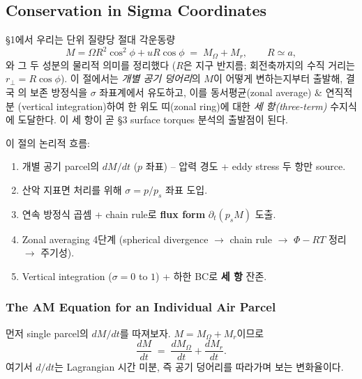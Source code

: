 \subsection{Conservation in Sigma Coordinates}

\S1에서 우리는 단위 질량당 절대 각운동량
\[
  M = \Omega R^2\cos^2\phi + u R\cos\phi
  \;=\; M_\Omega + M_r,
  \qquad R \simeq a,
\]
와 그 두 성분의 물리적 의미를 정리했다 ($R$은 지구 반지름;
회전축까지의 수직 거리는 $r_\perp = R\cos\phi$).  이 절에서는 \emph{개별 공기 덩어리}의
$M$이 어떻게 변하는지부터 출발해, 결국 의 보존 방정식을
$\sigma$ 좌표계에서 유도하고, 이를 동서평균(zonal average) $\&$ 연직적분
(vertical integration)하여 한 위도 띠(zonal ring)에 대한
\emph{세 항(three-term)} 수지식에 도달한다.  이 세 항이 곧
\S3 surface torques 분석의 출발점이 된다.


\begin{remarkbox}
이 절의 논리적 흐름:
\begin{enumerate}
  \item 개별 공기 parcel의 $dM/dt$ ($p$ 좌표) -- 압력 경도 + eddy stress 두 항만 source.
  \item 산악 지표면 처리를 위해 $\sigma = p/p_s$ 좌표 도입.
  \item 연속 방정식 곱셈 + chain rule로 \textbf{flux form} $\partial_t(p_s M)$ 도출.
  \item Zonal averaging 4단계 (spherical divergence $\to$ chain rule $\to$ $\Phi-RT$ 정리 $\to$ 주기성).
  \item Vertical integration ($\sigma=0$ to $1$) + 하한 BC로 \textbf{세 항} 잔존.
\end{enumerate}
\end{remarkbox}

\subsubsection{The AM Equation for an Individual Air Parcel}

먼저 single parcel의 $dM/dt$를 따져보자.  $M = M_\Omega + M_r$이므로
\begin{equation}\label{eq:ch07_cons_dMdt_split}
  \frac{d M}{dt}
  \;=\;
  \frac{d M_\Omega}{dt} + \frac{d M_r}{dt}.
\end{equation}
여기서 $d/dt$는 Lagrangian 시간 미분, 즉 공기 덩어리를 따라가며 보는 변화율이다.


